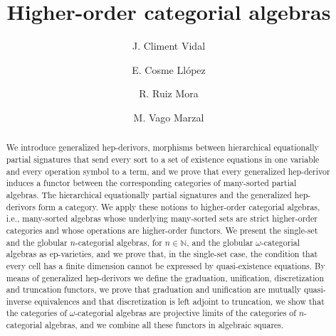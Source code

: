 \documentclass[a4paper, reqno
]{amsart}
\theoremstyle{plain}
\theoremstyle{definition}
\begin{document}
\title{Higher-order categorial algebras}

\author[Climent]{J. Climent Vidal}
\address{Universitat de Val\`{e}ncia\\
         Departament de L\`{o}gica i Filosofia de la Ci\`{e}ncia
         }

\author[Cosme]{E. Cosme Ll\'{o}pez}
\address{Universitat de Val\`{e}ncia\\
         Departament de Matem\`{a}tiques\\ and
         Nantong University\\
         School of Mathematics and Statistics
         }

\author[Ruiz]{R. Ruiz Mora}
\address{Universitat de Val\`{e}ncia\\
         Departament de Matem\`{a}tiques
         }

\author[Vago]{M. Vago Marzal}

\begin{abstract}
We introduce generalized hep-derivors, morphisms between hierarchical equationally partial signatures that send every sort to a set of existence equations in one variable and every operation symbol to a term, and we prove that every generalized hep-derivor induces a functor between the corresponding categories of many-sorted partial algebras.
The hierarchical equationally partial signatures and the generalized hep-derivors form a category.
We apply these notions to higher-order categorial algebras, i.e., many-sorted algebras whose underlying many-sorted sets are strict higher-order categories and whose operations are higher-order functors.
We present the single-set and the globular $n$-categorial algebras, for $n\in\mathbb{N}$, and the globular $\omega$-categorial algebras as ep-varieties, and we prove that, in the single-set case, the condition that every cell has a finite dimension cannot be expressed by quasi-existence equations.
By means of generalized hep-derivors we define the graduation, unification, discretization and truncation functors, we prove that graduation and unification are mutually quasi-inverse equivalences and that discretization is left adjoint to truncation, we show that the categories of $\omega$-categorial algebras are projective limits of the categories of $n$-categorial algebras, and we combine all these functors in algebraic squares.
\end{abstract}

\maketitle
\end{document}
